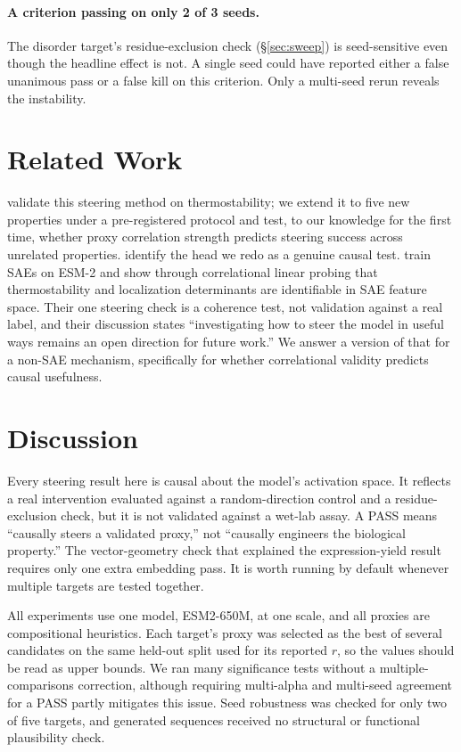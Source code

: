 \documentclass{article}
\begin{document}
\paragraph{A criterion passing on only 2 of 3 seeds.} The disorder target's
residue-exclusion check (\S\ref{sec:sweep}) is seed-sensitive even though
the headline effect is not. A single seed could have reported either a
false unanimous pass or a false kill on this criterion. Only a multi-seed
rerun reveals the instability.

\section{Related Work}

\citet{huang2025steering} validate this steering method on
thermostability; we extend it to five new properties under a
pre-registered protocol and test, to our knowledge for the first time,
whether proxy correlation strength predicts steering success across
unrelated properties. \citet{vig2021bertology} identify the head we redo
as a genuine causal test. \citet{adams2025mechanistic} train SAEs on
ESM-2 and show through correlational linear probing that thermostability
and localization determinants are identifiable in SAE feature space.
Their one steering check is a coherence test, not validation against a
real label, and their discussion states ``investigating how to steer the
model in useful ways remains an open direction for future work.'' We
answer a version of that for a non-SAE mechanism, specifically for
whether correlational validity predicts causal usefulness.

\section{Discussion}

Every steering result here is causal about the model's activation space.
It reflects a real intervention evaluated against a random-direction
control and a residue-exclusion check, but it is not validated against a
wet-lab assay. A PASS means ``causally steers a validated proxy,'' not
``causally engineers the biological property.'' The vector-geometry
check that explained the expression-yield result requires only one extra
embedding pass. It is worth running by default whenever multiple targets
are tested together.

All experiments use one model, ESM2-650M, at one scale, and all proxies
are compositional heuristics. Each target's proxy was selected as the best
of several candidates on the same held-out split used for its reported
$r$, so the values should be read as upper bounds. We ran many
significance tests without a multiple-comparisons correction, although
requiring multi-alpha and multi-seed agreement for a PASS partly
mitigates this issue. Seed robustness was checked for only two of five
targets, and generated sequences received no structural or functional
plausibility check.
\end{document}
